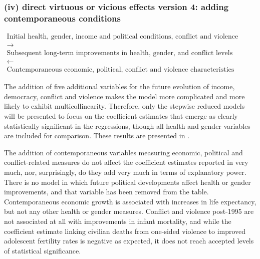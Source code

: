 \documentclass[12pt]{article}
\begin{document}
\subsubsection*{(iv) direct virtuous or vicious effects version 4: adding contemporaneous conditions}

\begin{equation*}\begin{gathered}
\text{Initial health, gender,  income and political conditions, conflict and violence conditions} \\
\longrightarrow \\
\text{Subsequent long-term improvements in health, gender, and conflict levels} \\
\longleftarrow \\
\text{Contemporaneous economic, political, conflict and violence characteristics}
\end{gathered}\end{equation*}
\bigskip

The addition of five additional variables for the future evolution of income, democracy, conflict and violence makes the model more complicated and more likely to exhibit multicollinearity. Therefore, only the stepwise reduced models will be presented to focus on the coefficient estimates that emerge as clearly statistically significant in the regressions, though all health and gender variables are included for comparison. These results are presented in .



The addition of contemporaneous variables measuring economic, political and conflict-related measures do not affect the coefficient estimates reported in  very much, nor, surprisingly, do they add very much in terms of explanatory power. There is no model in which future political developments affect health or gender improvements, and that variable has been removed from the table. Contemporaneous economic growth is associated with increases in life expectancy, but not any other health or gender measures. Conflict and violence post-1995 are not associated at all with improvements in infant mortality, and while the coefficient estimate linking civilian deaths from one-sided violence to improved adolescent fertility rates is negative as expected, it does not reach accepted levels of statistical significance.
\end{document}
